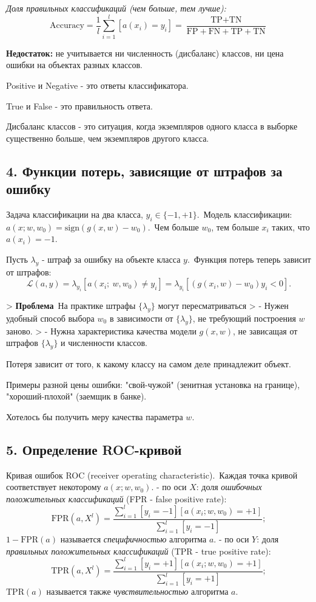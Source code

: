 \textit{Доля правильных классификаций (чем больше, тем лучше):}
$$\text{Accuracy} = \frac{1}{l} \sum_{i=1}^{l}{\left[ a{(x_i)} = y_i \right]} = \frac{\text{TP} + \text{TN}}{\text{FP} + \text{FN} + \text{TP} + \text{TN}}$$

\textbf{Недостаток:} не учитывается ни численность (дисбаланс) классов, ни цена
ошибки на объектах разных классов.

Positive и Negative - это ответы классификатора.

True и False - это правильность ответа.

Дисбаланс классов - это ситуация, когда экземпляров одного класса в выборке
существенно больше, чем экземпляров другого класса.

\subsection{4. Функции потерь, зависящие от штрафов за ошибку}

Задача классификации на два класса, $y_i \in {\lbrace -1, +1 \rbrace}$.\
Модель классификации: $a{(x; w, w_0)} = \text{sign}{\left( g{(x, w)} - w_0 \right)}$.\
Чем больше $w_0$, тем больше $x_i$ таких, что $a{(x_i)} = -1$.

Пусть $\lambda_y$ - штраф за ошибку на объекте класса $y$.\
Функция потерь теперь зависит от штрафов:$$\displaystyle \mathscr{L}{(a, y)} = \lambda_{y_i}{\left[ a{(x_i ; \: w, w_0) \neq y_i} \right]} = \lambda_{y_i}{\left[ {\left( g{(x_i, w)} - w_0 \right)} y_i < 0 \right]}.$$

> \textbf{Проблема}\
На практике штрафы ${\lbrace \lambda_y \rbrace}$ могут пересматриваться
> - Нужен удобный способ выбора $w_0$ в зависимости от ${\lbrace \lambda_y \rbrace}$, не требующий построения $w$ заново.
> - Нужна характеристика качества модели $g{(x, w)}$, не зависащая от
штрафов ${\lbrace \lambda_y \rbrace}$ и численности классов.

Потеря зависит от того, к какому классу на самом деле принадлежит объект.

Примеры разной цены ошибки: "свой-чужой" (зенитная установка на границе),
"хороший-плохой" (заемщик в банке).

Хотелось бы получить меру качества параметра $w$.

\subsection{5. Определение ROC-кривой}

Кривая ошибок ROC (receiver operating characteristic).\
Каждая точка кривой соответствует некоторому $a{(x; w, w_0)}$.
- по оси $X$: доля \textit{ошибочных положительных классификаций} (FPR - false positive rate):$$\text{FPR}{(a, X^l)} = \frac{\sum_{i=1}^{l}{\left[ y_i = -1 \right]}{\left[ a{(x_i; w, w_0)} = +1 \right]}}{\sum_{i=1}^{l}{\left[ y_i = -1 \right]}};$$
$1 - \text{FPR}{(a)}$ называется \textit{специфичностью} алгоритма $a$.
- по оси $Y$: доля \textit{правильных положительных классификаций} (TPR - true positive rate):$$\text{TPR}{(a, X^l)} = \frac{\sum_{i=1}^{l}{\left[ y_i = +1 \right]}{\left[ a{(x_i; w, w_0)} = +1 \right]}}{\sum_{i=1}^{l}{\left[ y_i = +1 \right]}};$$
$\text{TPR}{(a)}$ называется также \textit{чувствительностью} алгоритма $a$.

